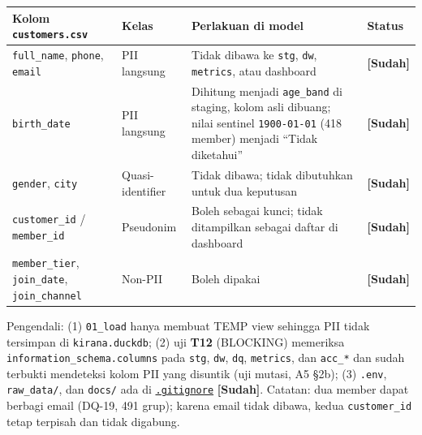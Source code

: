 \documentclass[10pt,a4paper]{article}
\begin{document}
{\def\LTcaptype{none} %
\begin{longtable}[]{@{}
  >{\raggedright\arraybackslash}p{}
  >{\raggedright\arraybackslash}p{}
  >{\raggedright\arraybackslash}p{}
  >{\raggedright\arraybackslash}p{}@{}}
\toprule\noalign{}
\begin{minipage}[b]{\linewidth}\raggedright
Kolom \texttt{customers.csv}
\end{minipage} & \begin{minipage}[b]{\linewidth}\raggedright
Kelas
\end{minipage} & \begin{minipage}[b]{\linewidth}\raggedright
Perlakuan di model
\end{minipage} & \begin{minipage}[b]{\linewidth}\raggedright
Status
\end{minipage} \\
\midrule\noalign{}
\endhead
\bottomrule\noalign{}
\endlastfoot
\texttt{full\_\allowbreak{}name}, \texttt{phone}, \texttt{email} & PII langsung & Tidak dibawa ke \texttt{stg}, \texttt{dw}, \texttt{metrics}, atau dashboard & \textbf{{[}Sudah{]}} \\
\texttt{birth\_\allowbreak{}date} & PII langsung & Dihitung menjadi \texttt{age\_\allowbreak{}band} di staging, kolom asli dibuang; nilai sentinel \texttt{1900-01-01} (418 member) menjadi ``Tidak diketahui'' & \textbf{{[}Sudah{]}} \\
\texttt{gender}, \texttt{city} & Quasi-identifier & Tidak dibawa; tidak dibutuhkan untuk dua keputusan & \textbf{{[}Sudah{]}} \\
\texttt{customer\_\allowbreak{}id} / \texttt{member\_\allowbreak{}id} & Pseudonim & Boleh sebagai kunci; tidak ditampilkan sebagai daftar di dashboard & \textbf{{[}Sudah{]}} \\
\texttt{member\_\allowbreak{}tier}, \texttt{join\_\allowbreak{}date}, \texttt{join\_\allowbreak{}channel} & Non-PII & Boleh dipakai & \textbf{{[}Sudah{]}} \\
\end{longtable}
}

Pengendali: (1) \texttt{01\_\allowbreak{}load} hanya membuat TEMP view sehingga PII tidak tersimpan di \texttt{kirana.duckdb}; (2) uji \textbf{T12} (BLOCKING) memeriksa \texttt{information\_\allowbreak{}schema.columns} pada \texttt{stg}, \texttt{dw}, \texttt{dq}, \texttt{metrics}, dan \texttt{acc\_\allowbreak{}*} dan sudah terbukti mendeteksi kolom PII yang disuntik (uji mutasi, A5 §2b); (3) \texttt{.env}, \texttt{raw\_\allowbreak{}data/}, dan \texttt{docs/} ada di \href{https://github.com/titan2903/kirana-omnichannel-performance-intelligence/blob/master/.gitignore}{\texttt{.gitignore}} \textbf{{[}Sudah{]}}. Catatan: dua member dapat berbagi email (DQ-19, 491 grup); karena email tidak dibawa, kedua \texttt{customer\_\allowbreak{}id} tetap terpisah dan tidak digabung.
\end{document}
